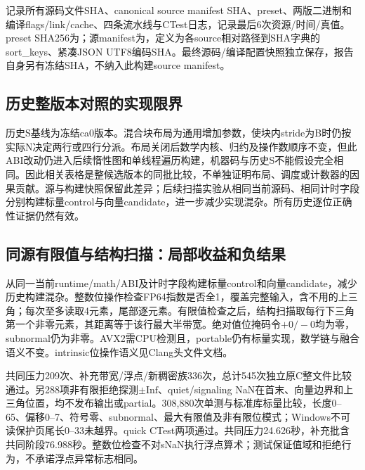 \documentclass[UTF8,a4paper,11pt]{ctexart}
\begin{document}
记录所有源码文件SHA、canonical source manifest SHA、preset、两版二进制和编译flags/link/cache、四条流水线与CTest日志，记录最后6次资源/时间/真值。preset SHA256为；源manifest为，定义为各source相对路径到SHA字典的sort\_keys、紧凑JSON UTF8编码SHA。最终源码/编译配置快照独立保存，报告自身另有冻结SHA，不纳入此构建source manifest。

\subsection{历史整版本对照的实现限界}
历史S基线为冻结ca0版本。混合块布局为通用增加参数，使块内stride为B时仍按实际N决定两行或四行分派。布局关闭后数学内核、归约及操作数顺序不变，但此ABI改动仍进入后续惰性图和单线程遍历构建，机器码与历史S不能假设完全相同。因此相关表格是整候选版本的同批比较，不单独证明布局、调度或计数器的因果贡献。源与构建快照保留此差异；后续扫描实验从相同当前源码、相同计时字段分别构建标量control与向量candidate，进一步减少实现混杂。所有历史逐位正确性证据仍然有效。

\subsection{同源有限值与结构扫描：局部收益和负结果}
从同一当前runtime/math/ABI及计时字段构建标量control和向量candidate，减少历史构建混杂。整数位操作检查FP64指数是否全1，覆盖完整输入，含不用的上三角；每次至多读取4元素，尾部逐元素。有限值检查之后，结构扫描取每行下三角第一个非零元素，其距离等于该行最大半带宽。绝对值位掩码令$+0/-0$均为零，subnormal仍为非零。AVX2需CPU检测且，portable仍有标量实现，数学链与融合语义不变。intrinsic位操作语义见Clang头文件文档\cite{avx2doc}。

共同压力209次、补充带宽/浮点/新稠密族336次，总计545次独立原C整文件比较通过。另288项非有限拒绝探测$\pm\mathrm{Inf}$、quiet/signaling NaN在首末、向量边界和上三角位置，均不发布输出或partial。308,880次单测与标准库标量比较，长度0--65、偏移0--7、符号零、subnormal、最大有限值及非有限位模式；Windows不可读保护页尾长0--33未越界。quick CTest两项通过。共同压力24.626秒，补充批含共同阶段76.988秒。整数位检查不对sNaN执行浮点算术；测试保证值域和拒绝行为，不承诺浮点异常标志相同。
\end{document}
